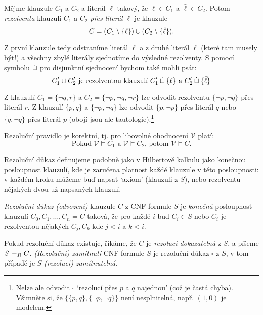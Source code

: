 \begin{definition}
    Mějme klauzule $C_1$ a $C_2$ a literál $\ell$ takový, že $\ell\in C_1$ a $\bar\ell\in C_2$. Potom \emph{rezolventa} klauzulí $C_1$ a $C_2$ \emph{přes literál} $\ell$ je klauzule
    $$
    C=(C_1\setminus\{\ell\})\mathbin{\cup} (C_2\setminus\{\bar\ell\}).
    $$
\end{definition}

Z první klauzule tedy odstraníme literál $\ell$ a z druhé literál $\bar\ell$ (které tam musely být!) a všechny zbylé literály sjednotíme do výsledné rezolventy. S pomocí symbolu $\mathbin{\dot{\sqcup}}$ pro disjunktní sjednocení bychom také mohli psát:
$$
C_1'\mathbin{\cup} C_2'\text{ je rezolventou klauzulí }C_1'\mathbin{\dot{\sqcup}}\{\ell\}\text{ a }C_2'\mathbin{\dot{\sqcup}}\{\bar \ell\}
$$

\begin{example}
    Z klauzulí $C_1=\{\neg q,r\}$ a $C_2=\{\neg p,\neg q,\neg r\}$ lze odvodit rezolventu  $\{\neg p,\neg q\}$ přes literál $r$. Z klauzulí $\{p,q\}$ a $\{\neg p,\neg q\}$ lze odvodit $\{p,\neg p\}$ přes literál $q$ nebo $\{q,\neg q\}$ přes literál $p$ (obojí jsou ale tautologie).\footnote{Nelze ale odvodit $\square$ `rezolucí přes $p$ a $q$ najednou' (což je častá chyba). Všimněte si, že $\{\{p,q\},\{\neg p,\neg q\}\}$ není nesplnitelná, např. $(1,0)$ je modelem.}
\end{example}

\begin{observation}
Rezoluční pravidlo je korektní, tj. pro libovolné ohodnocení $\mathcal V$ platí:
$$
\text{Pokud }\mathcal V\models C_1\text{ a }\mathcal V\models C_2\text{, potom }\mathcal V\models C.
$$
\end{observation}

Rezoluční důkaz definujeme podobně jako v Hilbertově kalkulu jako konečnou posloupnost klauzulí, kde je zaručena platnost každé klauzule v této posloupnosti: v každém kroku můžeme buď napsat `axiom' (klauzuli z $S$), nebo rezolventu nějakých dvou už napsaných klauzulí.

\begin{definition}
    \emph{Rezoluční důkaz (odvození)} klauzule $C$ z CNF formule $S$ je \emph{konečná} posloupnost klauzulí $C_0,C_1,\dots,C_n=C$
    taková, že pro každé $i$ buď $C_i\in S$ nebo $C_i$ je rezolventou nějakých $C_j,C_k$ kde $j<i$ a $k<i$.

    Pokud rezoluční důkaz existuje, říkáme, že $C$ je \emph{rezolucí dokazatelná} z $S$, a píšeme $S\proves_R C$. \emph{(Rezoluční) zamítnutí} CNF formule $S$ je rezoluční důkaz $\square$ z $S$, v tom případě je $S$ \emph{(rezolucí) zamítnutelná}.
\end{definition}

